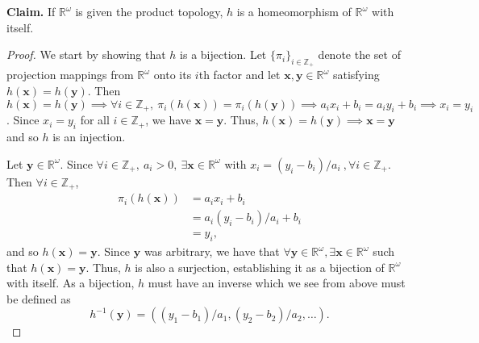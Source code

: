 \documentclass[a4paper,10pt]{article}
\newcommand{\bx}{\mathbf{x}}
\newcommand{\by}{\mathbf{y}}
\newcommand{\inv}{^{-1}}
\newcommand{\ZZ}{\mathbb{Z}}
\newcommand{\RR}{\mathbb{R}}
\begin{document}
\begin{solution}
    {\bf Claim.} If $\RR^\omega$ is given the product topology, $h$ is a homeomorphism of $\RR^\omega$ with itself.
    \begin{proof}
        We start by showing that $h$ is a bijection.
        Let $\{\pi_i\}_{i\in\ZZ_+}$ denote the set of projection mappings from $\RR^\omega$ onto its $i$th factor and let $\bx, \by \in \RR^\omega$ satisfying $h(\bx) = h(\by)$.
        Then $h(\bx) = h(\by) \implies \forall i \in \ZZ_+,~ \pi_i(h(\bx)) = \pi_i(h(\by)) \implies a_i x_i + b_i = a_i y_i + b_i \implies x_i = y_i$.
        Since $x_i = y_i$ for all $i \in \ZZ_+$, we have $\bx = \by$.
        Thus, $h(\bx) = h(\by) \implies  \bx = \by$ and so $h$ is an injection.

        Let $\by \in \RR^\omega$.
        Since $\forall i \in \ZZ_+,~ a_i > 0,~ \exists \bx \in \RR^\omega$ with $x_i = (y_i - b_i) / a_i~, \forall i \in \ZZ_+$.
        Then $\forall i \in \ZZ_+$,
        \begin{align*}
            \pi_i(h(\bx))   &= a_i x_i + b_i \\
                            &= a_i (y_i - b_i) / a_i + b_i \\
                            &= y_i,
        \end{align*}
        and so $h(\bx) = \by$.
        Since $\by$ was arbitrary, we have that $\forall \by \in \RR^\omega, \exists \bx \in \RR^\omega$ such that $h(\bx) = \by$.
        Thus, $h$ is also a surjection, establishing it as a bijection of $\RR^\omega$ with itself.
        As a bijection, $h$ must have an inverse which we see from above must be defined as
        \begin{equation*}
            h\inv(\by) = \left((y_1 - b_1) / a_1, (y_2 - b_2) / a_2, \ldots\right).
        \end{equation*}


\end{proof}
\end{solution}
\end{document}
